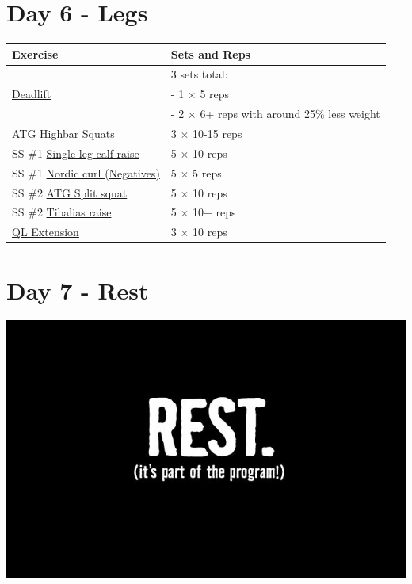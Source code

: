 \documentclass[11pt]{article}
\begin{document}
\section*{Day 6 - Legs}
\begin{center}
\begin{tabular}{|l|l|}
\hline
\textbf{Exercise} & \textbf{Sets and Reps}\\
\hline
& 3 sets total: \\
\href{https://www.youtube.com/shorts/vfKwjT5-86k}{Deadlift} & - 1 $\times$ 5 reps \\
& - 2 $\times$ 6+ reps with around 25\% less weight \\
\hline
\href{https://www.youtube.com/watch?v=zoZWgTrZLd8}{ATG Highbar Squats} & 3 $\times$ 10-15 reps \\
\hline
SS \#1 \href{https://www.youtube.com/watch?v=DlcI-MK6jAA}{Single leg calf raise} & 5 $\times$ 10 reps \\
SS \#1 \href{https://www.youtube.com/shorts/ybiNmYVkOe0}{Nordic curl (Negatives)} & 5 $\times$ 5 reps\\
\hline
SS \#2 \href{https://www.youtube.com/shorts/8i8aIERu0mA}{ATG Split squat} & 5 $\times$ 10 reps \\
SS \#2 \href{https://www.youtube.com/shorts/q-Gf5wm-zeU}{Tibalias raise} & 5 $\times$ 10+ reps \\
\hline
\href{https://www.youtube.com/shorts/MVu18rxmukk}{QL Extension} & 3 $\times$ 10 reps \\
\hline
\end{tabular}
\end{center}

\section*{Day 7 - Rest}
\includegraphics[width=\textwidth]{rest.jpg}
\end{document}
